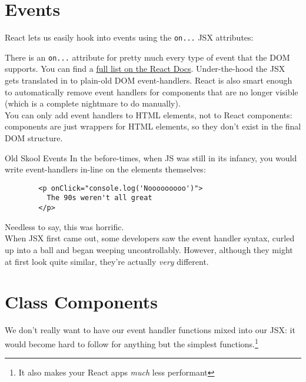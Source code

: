 \section{Events}

React lets us easily hook into events using the \texttt{on...} JSX attributes:


There is an \texttt{on...} attribute for pretty much every type of event that the DOM supports. You can find a \href{https://facebook.github.io/react/docs/events.html#supported-events}{full list on the React Docs}. Under-the-hood the JSX gets translated in to plain-old DOM event-handlers. React is also smart enough to automatically remove event handlers for components that are no longer visible (which is a complete nightmare to do manually).
\\

You can only add event handlers to HTML elements, not to React components: components are just wrappers for HTML elements, so they don't exist in the final DOM structure.

\begin{infobox}{Old Skool Events}
    In the before-times, when JS was still in its infancy, you would write event-handlers in-line on the elements themselves:

    \begin{verbatim}
        <p onClick="console.log('Nooooooooo')">
          The 90s weren't all great
        </p>
    \end{verbatim}

    Needless to say, this was horrific.
    \\

    When JSX first came out, some developers saw the event handler syntax, curled up into a ball and  began weeping uncontrollably. However, although they might at first look quite similar, they're actually \textit{very} different.
\end{infobox}



\section{Class Components}

We don't really want to have our event handler functions mixed into our JSX: it would become hard to follow for anything but the simplest functions.\footnote{It also makes your React apps \textit{much} less performant}
\\

